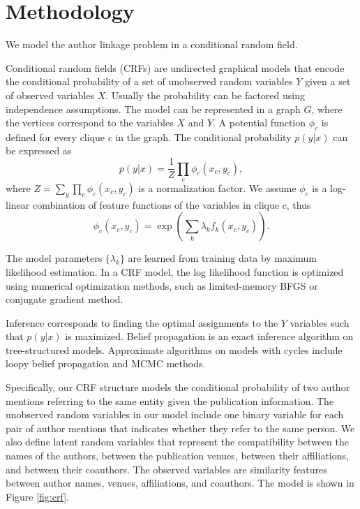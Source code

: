 \documentclass[twocolumn,letterpaper]{article}
\begin{document}

\section{Methodology} %
\label{sec:methodology}
We model the author linkage problem in a conditional random field.

Conditional random fields (CRFs) are undirected graphical models that encode the conditional probability of a set of unobserved random variables $Y$ given a set of observed variables $X$.  Usually the probability can be factored using independence assumptions.  The model can be represented in a graph $G$, where the vertices correspond to the variables $X$ and $Y$.  A potential function $\phi_c$ is defined for every clique $c$ in the graph.  The conditional probability $p(y|x)$ can be expressed as
$$p(y|x)=\frac{1}{Z}\prod_c \phi_c(x_c,y_c),$$
where $Z=\sum_y\prod_c \phi_c(x_c,y_c)$ is a normalization factor.  We assume $\phi_c$ is a log-linear combination of feature functions of the variables in clique $c$, thus
$$\phi_c(x_c,y_c)=\exp\left(\sum_k \lambda_k f_k(x_c,y_c)\right).$$

The model parameters $\{\lambda_k\}$ are learned from training data by
maximum likelihood estimation.  In a CRF model, the log likelihood
function is optimized using numerical optimization methods, such as
limited-memory BFGS or conjugate gradient method.

Inference corresponds to finding the optimal assignments to the $Y$
variables such that $p(y|x)$ is maximized.   Belief propagation is an
exact inference algorithm on tree-structured models.  Approximate
algorithms on models with cycles include loopy belief propagation and
MCMC methods.



Specifically, our CRF structure models the conditional probability of
two author mentions referring to the same entity given the publication
information.  The unobserved random variables in our model include one
binary variable for each pair of author mentions that indicates
whether they refer to the same person.  We also define latent random
variables that represent the compatibility between the names of the
authors, between the publication venues, between their affiliations,
and between their coauthors.  The observed variables are similarity
features between author names, venues, affiliations, and coauthors.
The model is shown in Figure \ref{fig:crf}.
\end{document}
